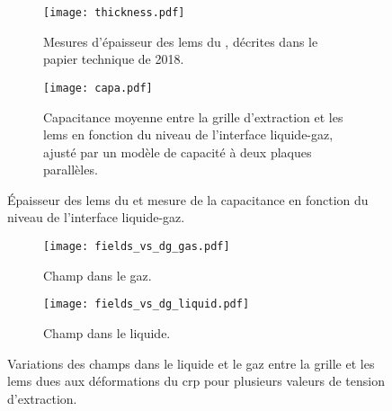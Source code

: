      \begin{figure}[htbp]
        \centering
        \begin{subfigure}[t]{0.48\textwidth}
          \centering
          \texttt{[image: thickness.pdf]}
          \caption{\label{fig::lem_thicnkess_311}Mesures d'épaisseur des \glspl{lem} du \TOO{}, décrites dans le papier technique de 2018\cite{Aimard2018}.}
        \end{subfigure}\hfill
        \begin{subfigure}[t]{0.48\textwidth}
          \centering
          \texttt{[image: capa.pdf]}
          \caption{\label{fig::capa}Capacitance moyenne entre la grille d'extraction et les \glspl{lem} en fonction du niveau de l'interface liquide-gaz, ajusté par un modèle de capacité à deux plaques parallèles.}
        \end{subfigure}
        \caption[Épaisseur des \glspl{lem} du \TOO{} et mesure de la capacitance en fonction du niveau de l'interface liquide-gaz]{Épaisseur des \glspl{lem} du \TOO{} et mesure de la capacitance en fonction du niveau de l'interface liquide-gaz.}
      \end{figure}


      \begin{figure}[htbp]
        \centering
        \begin{subfigure}[t]{0.48\textwidth}
          \centering
          \texttt{[image: fields\_vs\_dg\_gas.pdf]}
          \caption{Champ dans le gaz.}
        \end{subfigure}\hfill
        \begin{subfigure}[t]{0.48\textwidth}
          \centering
          \texttt{[image: fields\_vs\_dg\_liquid.pdf]}
          \caption{Champ dans le liquide.}
        \end{subfigure}
        \caption[Variations des champs d'extraction dues à la déformation du CRP]{\label{fig::fields_vs_dg}Variations des champs dans le liquide et le gaz entre la grille et les \glspl{lem} dues aux déformations du \gls{crp} pour plusieurs valeurs de tension d'extraction.}
      \end{figure}


